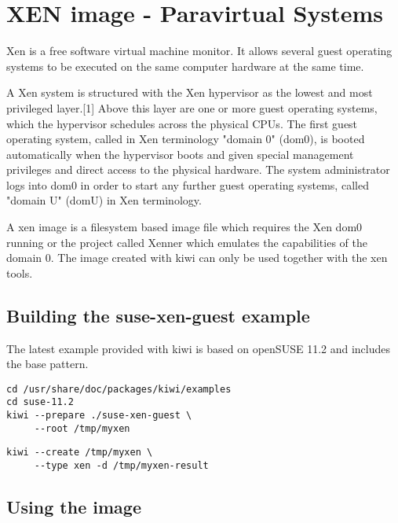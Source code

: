 \chapter{XEN image - Paravirtual Systems}
\label{chapter:xen}
\minitoc

Xen is a free software virtual machine monitor. It allows several
guest operating systems to be executed on the same computer hardware
at the same time.

A Xen system is structured with the Xen hypervisor as the lowest and
most privileged layer.[1] Above this layer are one or more guest
operating systems, which the hypervisor schedules across the physical
CPUs. The first guest operating system, called in Xen terminology
"domain 0" (dom0), is booted automatically when the hypervisor boots
and given special management privileges and direct access to the physical
hardware. The system administrator logs into dom0 in order to start
any further guest operating systems, called "domain U" (domU) in
Xen terminology.

A xen image is a filesystem based image file which requires the
Xen dom0 running or the project called Xenner which emulates
the capabilities of the domain 0. The image created with kiwi
can only be used together with the xen tools.

\section{Building the suse-xen-guest example}

The latest example provided with kiwi is based on openSUSE 11.2 and includes
the base pattern. 

\begin{Command}{12cm}
\begin{verbatim}
cd /usr/share/doc/packages/kiwi/examples
cd suse-11.2
kiwi --prepare ./suse-xen-guest \
     --root /tmp/myxen
\end{verbatim}
\end{Command}

\begin{Command}{12cm}
\begin{verbatim}
kiwi --create /tmp/myxen \
     --type xen -d /tmp/myxen-result
\end{verbatim}
\end{Command}

\section{Using the image}

